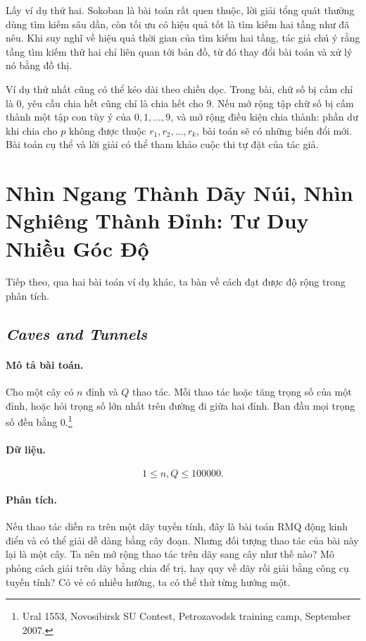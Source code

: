 \documentclass[11pt]{article}
\begin{document}
Lấy ví dụ thứ hai. Sokoban là bài toán rất quen thuộc, lời giải tổng quát
thường dùng tìm kiếm sâu dần, còn tối ưu có hiệu quả tốt là tìm kiếm hai tầng
như đã nêu. Khi suy nghĩ về hiệu quả thời gian của tìm kiếm hai tầng, tác giả
chú ý rằng tầng tìm kiếm thứ hai chỉ liên quan tới bản đồ, từ đó thay đổi bài
toán và xử lý nó bằng đồ thị.

Ví dụ thứ nhất cũng có thể kéo dài theo chiều dọc. Trong bài, chữ số bị cấm
chỉ là \(0\), yêu cầu chia hết cũng chỉ là chia hết cho \(9\). Nếu mở rộng tập
chữ số bị cấm thành một tập con tùy ý của \(0,1,\ldots,9\), và mở rộng điều
kiện chia thành: phần dư khi chia cho \(p\) không được thuộc
\(r_1,r_2,\ldots,r_k\), bài toán sẽ có những biến đổi mới. Bài toán cụ thể và
lời giải có thể tham khảo cuộc thi tự đặt của tác giả.

\section{Nhìn Ngang Thành Dãy Núi, Nhìn Nghiêng Thành Đỉnh: Tư Duy Nhiều Góc Độ}

Tiếp theo, qua hai bài toán ví dụ khác, ta bàn về cách đạt được độ rộng trong
phân tích.

\subsection{\textit{Caves and Tunnels}}

\paragraph{Mô tả bài toán.}
Cho một cây có \(n\) đỉnh và \(Q\) thao tác. Mỗi thao tác hoặc tăng trọng số
của một đỉnh, hoặc hỏi trọng số lớn nhất trên đường đi giữa hai đỉnh. Ban đầu
mọi trọng số đều bằng \(0\).\footnote{Ural 1553, Novosibirsk SU Contest,
Petrozavodsk training camp, September 2007.}

\paragraph{Dữ liệu.}
\[
  1\le n,Q\le 100000.
\]

\paragraph{Phân tích.}
Nếu thao tác diễn ra trên một dãy tuyến tính, đây là bài toán RMQ động kinh
điển và có thể giải dễ dàng bằng cây đoạn. Nhưng đối tượng thao tác của bài
này lại là một cây. Ta nên mở rộng thao tác trên dãy sang cây như thế nào?
Mô phỏng cách giải trên dãy bằng chia để trị, hay quy về dãy rồi giải bằng
công cụ tuyến tính? Có vẻ có nhiều hướng, ta có thể thử từng hướng một.
\end{document}
